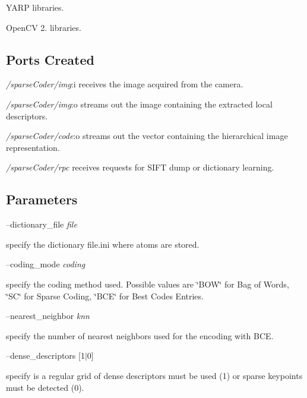 \begin{DoxyItemize}
\item Y\+A\+RP libraries.
\item Open\+CV 2. libraries.
\end{DoxyItemize}\hypertarget{group__icub__sparseCoder_portsc_sec}{}\subsection{Ports Created}\label{group__icub__sparseCoder_portsc_sec}

\begin{DoxyItemize}
\item {\itshape /sparse\+Coder/img}\+:i receives the image acquired from the camera.
\item {\itshape /sparse\+Coder/img}\+:o streams out the image containing the extracted local descriptors.
\item {\itshape /sparse\+Coder/code}\+:o streams out the vector containing the hierarchical image representation.
\item {\itshape /sparse\+Coder/rpc} receives requests for S\+I\+FT dump or dictionary learning.
\end{DoxyItemize}\hypertarget{group__GIECoder_parameters_sec}{}\subsection{Parameters}\label{group__GIECoder_parameters_sec}
--dictionary\+\_\+file {\itshape file} 
\begin{DoxyItemize}
\item specify the dictionary file.\+ini where atoms are stored.
\end{DoxyItemize}

--coding\+\_\+mode {\itshape coding} 
\begin{DoxyItemize}
\item specify the coding method used. Possible values are \char`\"{}\+B\+O\+W\char`\"{} for Bag of Words, \char`\"{}\+S\+C\char`\"{} for Sparse Coding, \char`\"{}\+B\+C\+E\char`\"{} for Best Codes Entries.
\end{DoxyItemize}

--nearest\+\_\+neighbor {\itshape knn} 
\begin{DoxyItemize}
\item specify the number of nearest neighbors used for the encoding with B\+CE.
\end{DoxyItemize}

--dense\+\_\+descriptors {\itshape }\mbox{[}1$\vert$0\mbox{]}
\begin{DoxyItemize}
\item specify is a regular grid of dense descriptors must be used (1) or sparse keypoints must be detected (0).
\end{DoxyItemize}

